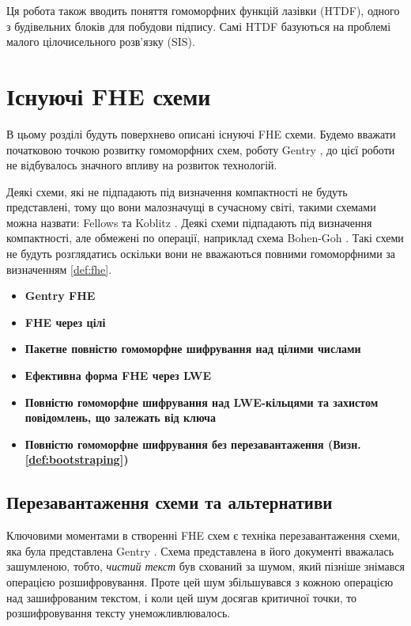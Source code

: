 Ця робота також вводить поняття гомоморфних функцій лазівки (HTDF), одного з будівельних
блоків для побудови підпису. Самі HTDF базуються на проблемі малого цілочисельного розв'язку (SIS).

\section{Існуючі FHE схеми}
В цьому розділі будуть поверхнево описані існуючі FHE схеми. Будемо вважати початковою
точкою розвитку гомоморфних схем, роботу Gentry \cite{homenc}, до цієї роботи не 
відбувалось значного впливу на розвиток технологій.

Деякі схеми, які не підпадають під визначення компактності не будуть представлені, тому що
вони малозначущі в сучасному світі, такими схемами можна назвати: Fellows та Koblitz
\cite{fellows1994}. Деякі схеми підпадають під визначення компактності, але обмежені по
операції, наприклад схема Bohen-Goh \cite{10.1007/978-3-540-30576-7_18}. Такі схеми не
будуть розглядатись оскільки вони не вважаються повними гомоморфними за визначенням \ref{def:fhe}.

\begin{itemize}
    \item{\textbf{Gentry FHE \cite{homenc}} } 
    \item{\textbf{FHE через цілі \cite{cryptoeprint:2009/616}} }
    \item{\textbf{Пакетне повністю гомоморфне шифрування над цілими числами \cite{eurocrypt-2013-25038}} }
    \item{\textbf{Ефективна форма FHE через LWE \cite{cryptoeprint:2011/344}} }
    \item{\textbf{Повністю гомоморфне шифрування над LWE-кільцями та захистом повідомлень,
        що залежать від ключа \cite{10.1007/978-3-642-22792-9_29}} } 
    \item{\textbf{Повністю гомоморфне шифрування без перезавантаження (Визн. \ref{def:bootstraping}) \cite{journals/eccc/BrakerskiGV11}} }
\end{itemize}

\subsection{Перезавантаження схеми та альтернативи}
Ключовими моментами в створенні FHE схем є техніка перезавантаження схеми, яка була
представлена Gentry \cite{homenc}. Схема представлена в його документі вважалась зашумленою,
тобто, \emph{чистий текст} був схований за шумом, який пізніше знімався операцією
розшифровування. Проте цей шум збільшувався з кожною операцією над зашифрованим текстом,
і коли цей шум досягав критичної точки, то розшифровування тексту унеможливлювалось.

